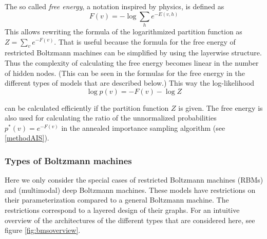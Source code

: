 \documentclass[12pt]{article}
\begin{document}
The so called \emph{free energy}, a notation inspired by physics, is defined as
\[
   F(v) = - \log \sum_h e^{-E(v, h)}
\]
This allows rewriting the formula of the logarithmized partition function as $Z = \sum_v e^{-F(v)}$.
That is useful because the formula for the free energy of restricted Boltzmann machines can be simplified by using the layerwise structure.
Thus the complexity of calculating the free energy becomes linear in the number of hidden nodes. (This can be seen in the formulas for the free energy in the different types of models that are described below.)
This way the log-likelihood
\begin{equation}
   \log p(v) = - F(v) - \log Z
\label{eqn:pRBMfreeenergy}
\end{equation}

can be calculated efficiently if the partition function $Z$ is given. The free energy is also used for calculating the ratio of the unnormalized probabilities $p^*(v) = e^{-F(v)}$ in the annealed importance sampling algorithm (see \ref{methodAIS}).

\subsubsection{Types of Boltzmann machines}

Here we only consider the special cases of restricted Boltzmann machines (RBMs) and (multimodal) deep Boltzmann machines.
These models have restrictions on their parameterization compared to a general Boltzmann machine.
The restrictions correspond to a layered design of their graphs.
For an intuitive overview of the architectures of the different types that are considered here, see figure \ref{fig:bmsoverview}.
\end{document}

